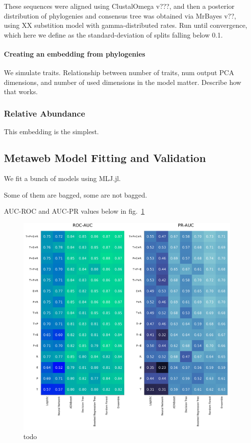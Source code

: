 \documentclass[11pt]{article}
\makeatletter
\def\maxwidth{\ifdim\Gin@nat@width>\linewidth\linewidth
\else\Gin@nat@width\fi}
\let\Oldincludegraphics\includegraphics
\renewcommand{\includegraphics}[1]{\Oldincludegraphics[width=\maxwidth]{#1}}
\makeatother
\begin{document}
These sequences were aligned using ClustalOmega v???, and then a
posterior distribution of phylogenies and consensus tree was obtained
via MrBayes v??, using XX substition model with gamma-distributed rates.
Run until convergence, which here we define as the standard-deviation of
splits falling below 0.1.

\hypertarget{creating-an-embedding-from-phylogenies}{%
\paragraph{Creating an embedding from
phylogenies}\label{creating-an-embedding-from-phylogenies}}

We simulate traits. Relationship between number of traits, num output
PCA dimensions, and number of used dimensions in the model matter.
Describe how that works.

\hypertarget{relative-abundance}{%
\subsubsection{Relative Abundance}\label{relative-abundance}}

This embedding is the simplest.

\hypertarget{metaweb-model-fitting-and-validation}{%
\subsection{Metaweb Model Fitting and
Validation}\label{metaweb-model-fitting-and-validation}}

We fit a bunch of models using MLJ.jl.

Some of them are bagged, some are not bagged.

AUC-ROC and AUC-PR values below in fig.~\ref{fig:prroc}

\begin{figure}
\hypertarget{fig:prroc}{%
\centering
\includegraphics{./figures/PR_ROC.png}
\caption{todo}\label{fig:prroc}
}
\end{figure}
\end{document}
